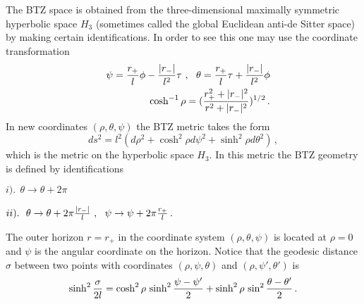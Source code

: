 \documentclass[12pt]{article}
\begin{document}
                             
The BTZ space is obtained from the three-dimensional maximally symmetric hyperbolic space $H_3$ (sometimes called the global Euclidean anti-de Sitter space) by making certain identifications.
In order to see this one may use the coordinate transformation
\begin{eqnarray}
&&\psi={r_+\over l} \phi-{|r_-|\over l^2}\tau~, ~~\theta={r_+\over l} \tau
+{|r_-|\over l^2}\phi \nonumber \\
&&\cosh^{-1}\rho  =({r^2_++|r_-|^2 \over r^2+|r_-|^2})^{1/2}\, .
\label{transformation to H3}
\end{eqnarray}                           
In new coordinates $(\rho, \theta,\psi)$ the BTZ metric  takes the form
\begin{equation}
ds^2=l^2 \left( d\rho^2+\cosh^2\rho d\psi^2+\sinh^2\rho d\theta^2 \right)\, ,
\label{global AdS}
\end{equation}                          
which is the metric on the hyperbolic space $H_3$. In this metric the BTZ geometry     is defined by identifications

$i).~~\theta\rightarrow \theta+2\pi 
$

$
ii). ~~\theta\rightarrow \theta+2\pi {|r_-|\over l}~,~~\psi\rightarrow\psi+
2\pi{r_+\over l}\, .
$

\noindent The outer horizon $r=r_+$ in the coordinate system $(\rho,\theta,\psi)$ is located at $\rho=0$ and $\psi$ is the angular coordinate on the horizon.
 Notice that the geodesic distance $\sigma$ between two points with coordinates $(\rho,\psi,\theta)$ and $(\rho,\psi',\theta')$ is
\begin{equation}
\sinh^2{\sigma \over 2l}=\cosh^2\rho\, \sinh^2{\psi-\psi'\over 2}+\sinh^2\rho \, \sin^2{\theta-\theta' \over 2}\, .
\label{geodesic distance}
\end{equation}
                        
\end{document}

